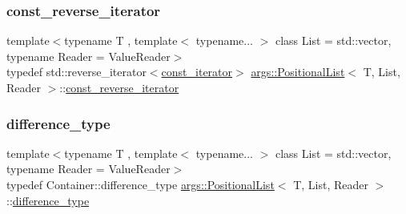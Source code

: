 \mbox{\label{classargs_1_1_positional_list_a366152cdac874c51818e8cbb8f48feac}} 
\subsubsection{\texorpdfstring{const\+\_\+reverse\+\_\+iterator}{const\_reverse\_iterator}}
{\footnotesize\ttfamily template$<$typename T , template$<$ typename... $>$ class List = std\+::vector, typename Reader  = Value\+Reader$>$ \\
typedef std\+::reverse\+\_\+iterator$<$\hyperlink{classargs_1_1_positional_list_a5675a3e27a2a7fc6a7fbd933bd13f3cf}{const\+\_\+iterator}$>$ \hyperlink{classargs_1_1_positional_list}{args\+::\+Positional\+List}$<$ T, List, Reader $>$\+::\hyperlink{classargs_1_1_positional_list_a366152cdac874c51818e8cbb8f48feac}{const\+\_\+reverse\+\_\+iterator}}

\mbox{\label{classargs_1_1_positional_list_a369e886a82dc1a8654e584ad8b7e696f}} 
\subsubsection{\texorpdfstring{difference\+\_\+type}{difference\_type}}
{\footnotesize\ttfamily template$<$typename T , template$<$ typename... $>$ class List = std\+::vector, typename Reader  = Value\+Reader$>$ \\
typedef Container\+::difference\+\_\+type \hyperlink{classargs_1_1_positional_list}{args\+::\+Positional\+List}$<$ T, List, Reader $>$\+::\hyperlink{classargs_1_1_positional_list_a369e886a82dc1a8654e584ad8b7e696f}{difference\+\_\+type}}

\mbox{\label{classargs_1_1_positional_list_ad0833c77245d7bc7678de4896d8443da}} 
